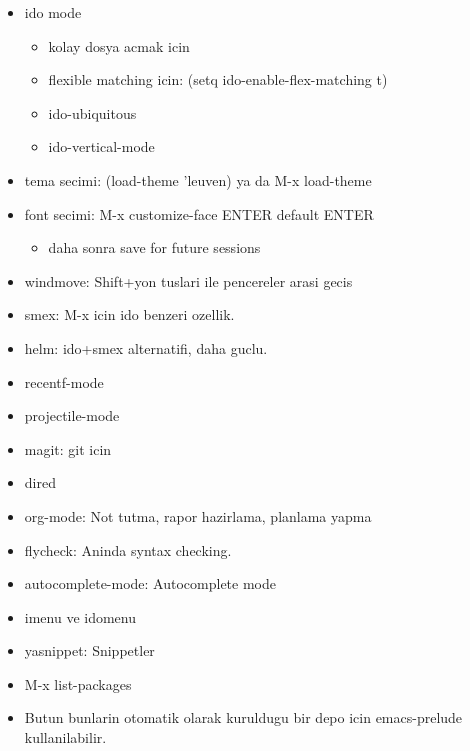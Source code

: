 \documentclass[11pt]{article}
\begin{document}
\begin{itemize}
\item ido mode
\begin{itemize}
\item kolay dosya acmak icin
\item flexible matching icin: (setq ido-enable-flex-matching t)
\item ido-ubiquitous
\item ido-vertical-mode
\end{itemize}

\item tema secimi: (load-theme 'leuven) ya da M-x load-theme

\item font secimi: M-x customize-face ENTER default ENTER
\begin{itemize}
\item daha sonra save for future sessions
\end{itemize}

\item windmove: Shift+yon tuslari ile pencereler arasi gecis

\item smex: M-x icin ido benzeri ozellik.

\item helm: ido+smex alternatifi, daha guclu.

\item recentf-mode

\item projectile-mode

\item magit: git icin

\item dired

\item org-mode: Not tutma, rapor hazirlama, planlama yapma

\item flycheck: Aninda syntax checking.

\item autocomplete-mode: Autocomplete mode

\item imenu ve idomenu

\item yasnippet: Snippetler

\item M-x list-packages

\item Butun bunlarin otomatik olarak kuruldugu bir depo icin emacs-prelude
kullanilabilir.
\end{itemize}
\end{document}
